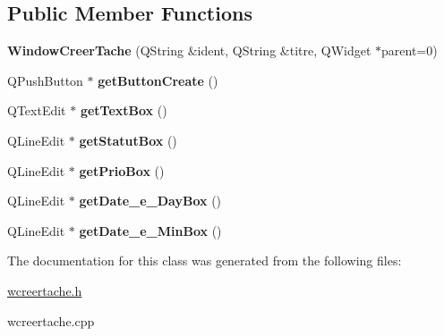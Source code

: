 \subsection*{Public Member Functions}
\begin{DoxyCompactItemize}
\item 
\mbox{\label{class_window_creer_tache_ab15914bdeec16e103baef7c5459a3789}} 
{\bfseries Window\+Creer\+Tache} (Q\+String \&ident, Q\+String \&titre, Q\+Widget $\ast$parent=0)
\item 
\mbox{\label{class_window_creer_tache_a35485f8fc864b06fc51fc80deaa675ec}} 
Q\+Push\+Button $\ast$ {\bfseries get\+Button\+Create} ()
\item 
\mbox{\label{class_window_creer_tache_a97c7f8d5fa7511bd52422a1b3195988d}} 
Q\+Text\+Edit $\ast$ {\bfseries get\+Text\+Box} ()
\item 
\mbox{\label{class_window_creer_tache_a4cf25dd76c6f5df7694546afe0708342}} 
Q\+Line\+Edit $\ast$ {\bfseries get\+Statut\+Box} ()
\item 
\mbox{\label{class_window_creer_tache_a8792e508badea882f18c9d40c2dc6a61}} 
Q\+Line\+Edit $\ast$ {\bfseries get\+Prio\+Box} ()
\item 
\mbox{\label{class_window_creer_tache_a2e95cafe8191c63dd28b05083a43258a}} 
Q\+Line\+Edit $\ast$ {\bfseries get\+Date\+\_\+e\+\_\+\+Day\+Box} ()
\item 
\mbox{\label{class_window_creer_tache_a235852531968476fc5330b393d67f0eb}} 
Q\+Line\+Edit $\ast$ {\bfseries get\+Date\+\_\+e\+\_\+\+Min\+Box} ()
\end{DoxyCompactItemize}


The documentation for this class was generated from the following files\+:\begin{DoxyCompactItemize}
\item 
\hyperlink{wcreertache_8h}{wcreertache.\+h}\item 
wcreertache.\+cpp\end{DoxyCompactItemize}
